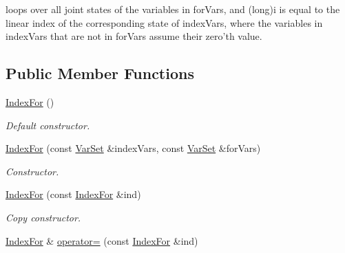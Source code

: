  loops over all joint states of the variables in forVars, and (long)i is equal to the linear index of the corresponding state of indexVars, where the variables in indexVars that are not in forVars assume their zero'th value. \subsection*{Public Member Functions}
\begin{CompactItemize}
\item 
\hypertarget{classdai_1_1IndexFor_7ce4ecff14943ca0e4303d309e1e79d3}{
\hyperlink{classdai_1_1IndexFor_7ce4ecff14943ca0e4303d309e1e79d3}{IndexFor} ()}
\label{classdai_1_1IndexFor_7ce4ecff14943ca0e4303d309e1e79d3}

\begin{CompactList}\small\item\em Default constructor. \item\end{CompactList}\item 
\hypertarget{classdai_1_1IndexFor_3780be9d74b4c1b0ed1713d7cab8211c}{
\hyperlink{classdai_1_1IndexFor_3780be9d74b4c1b0ed1713d7cab8211c}{IndexFor} (const \hyperlink{classdai_1_1VarSet}{VarSet} \&indexVars, const \hyperlink{classdai_1_1VarSet}{VarSet} \&forVars)}
\label{classdai_1_1IndexFor_3780be9d74b4c1b0ed1713d7cab8211c}

\begin{CompactList}\small\item\em Constructor. \item\end{CompactList}\item 
\hypertarget{classdai_1_1IndexFor_bff0c6df34e8419eb1efc3c3678493fa}{
\hyperlink{classdai_1_1IndexFor_bff0c6df34e8419eb1efc3c3678493fa}{IndexFor} (const \hyperlink{classdai_1_1IndexFor}{IndexFor} \&ind)}
\label{classdai_1_1IndexFor_bff0c6df34e8419eb1efc3c3678493fa}

\begin{CompactList}\small\item\em Copy constructor. \item\end{CompactList}\item 
\hypertarget{classdai_1_1IndexFor_b73fb61544f054c63e87342d494c8a38}{
\hyperlink{classdai_1_1IndexFor}{IndexFor} \& \hyperlink{classdai_1_1IndexFor_b73fb61544f054c63e87342d494c8a38}{operator=} (const \hyperlink{classdai_1_1IndexFor}{IndexFor} \&ind)}
\label{classdai_1_1IndexFor_b73fb61544f054c63e87342d494c8a38}


\end{CompactItemize}
